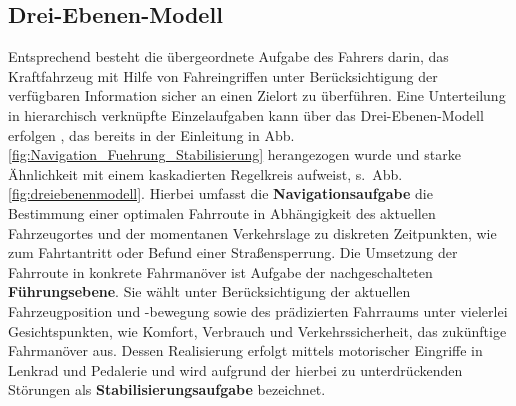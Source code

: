\subsection{Drei-Ebenen-Modell} \label{sec:drei-ebenen-modell}
Entsprechend \cite{handbuchFAS_Donges2012} besteht die übergeordnete Aufgabe des Fahrers darin, das Kraftfahrzeug mit Hilfe von Fahreingriffen unter Berücksichtigung der verfügbaren Information sicher an einen Zielort zu überführen. Eine Unterteilung in hierarchisch verknüpfte Einzelaufgaben kann über das Drei-Ebenen-Modell erfolgen \cite{donges1982aas}, das bereits in der Einleitung in Abb.\,\ref{fig:Navigation_Fuehrung_Stabilisierung} herangezogen wurde und starke Ähnlichkeit mit einem kaskadierten Regelkreis \cite{graf2003neue} aufweist, s.\ Abb.\,\ref{fig:dreiebenenmodell}. Hierbei umfasst die \textbf{Navigationsaufgabe} die Bestimmung einer optimalen Fahrroute in Abhängigkeit des aktuellen Fahrzeugortes und der momentanen Verkehrslage zu diskreten Zeitpunkten, wie zum Fahrtantritt oder Befund einer Straßensperrung. Die Umsetzung der Fahrroute in konkrete Fahrmanöver ist Aufgabe der nachgeschalteten \textbf{Führungsebene}. Sie wählt unter Berücksichtigung der aktuellen Fahrzeugposition und -bewegung sowie des prädizierten Fahrraums  unter vielerlei Gesichtspunkten, wie Komfort, Verbrauch und Verkehrssicherheit, das zukünftige Fahrmanöver aus. Dessen Realisierung erfolgt mittels motorischer Eingriffe in Lenkrad und Pedalerie und wird aufgrund der hierbei zu unterdrückenden Störungen als \textbf{Stabilisierungsaufgabe} bezeichnet. 


